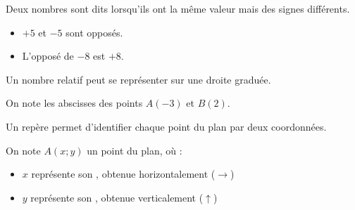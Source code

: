 \documentclass[../Chapitre2.tex]{subfiles}
\begin{document}
\begin{definition}
  Deux nombres sont dits  lorsqu'ils ont la même valeur mais des signes différents.
\end{definition}


\begin{exemple}
    \begin{itemize}
      \item $+5$ et $-5$ sont opposés.
      \item L'opposé de $-8$ est $+8$.
    \end{itemize}
\end{exemple}




\begin{remarque}
    Un nombre relatif peut se représenter sur une droite graduée.
\end{remarque}


\begin{exemple}

  \bigskip 

  On note les abscisses des points $A(-3)$ et $B(2)$.
\end{exemple}

\sautfiche





\begin{definition}
  Un repère permet d'identifier chaque point du plan par deux coordonnées. 
  
  On note $A(x;y)$ un point du plan, où :

  \begin{itemize}
    \item $x$ représente son , obtenue horizontalement ($\rightarrow$)
    \item $y$ représente son , obtenue verticalement ($\uparrow$)
  \end{itemize}
\end{definition}
\end{document}
